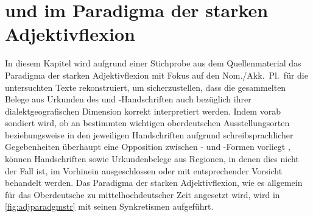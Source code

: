 \chapter{ und  im Paradigma der starken Adjektivflexion}
\label{ch:adjflex}

In diesem Kapitel wird aufgrund einer Stichprobe aus dem Quellenmaterial das
Paradigma der starken Adjektivflexion mit Fokus auf den Nom./Akk.\ Pl.\ für die
untersuchten Texte rekonstruiert, um sicherzustellen, dass die gesammelten
Belege aus Urkunden des \CAO{} und \KC{}-Handschriften auch
bezüglich ihrer dialektgeografischen Dimension korrekt interpretiert werden.
Indem vorab sondiert wird, ob an bestimmten wichtigen oberdeutschen
Ausstellungs\-orten beziehungsweise in den jeweiligen Handschriften aufgrund
schreibsprachlicher Gegebenheiten überhaupt eine Opposition zwischen -
und -Formen vorliegt \autocite[vgl.][182]{ksw2}, können Handschriften
sowie Urkundenbelege aus Regionen, in denen dies nicht der Fall ist, im
Vorhinein ausgeschlossen oder mit entsprechender Vorsicht behandelt werden. Das
Paradigma der starken Adjektivflexion, wie es allgemein für das Oberdeutsche zu
mittelhochdeutscher Zeit angesetzt wird, wird in \cref{fig:adjparadgmstr} mit
seinen Synkretismen aufgeführt.


